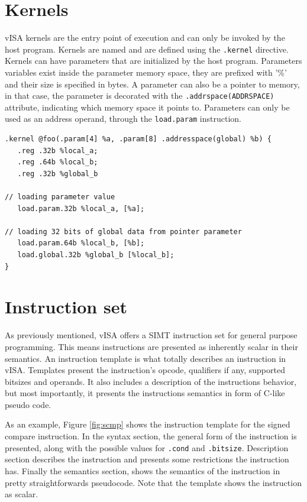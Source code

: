 \section{Kernels}
vISA kernels are the entry point of execution and can only be invoked by the
host program. Kernels are named and are defined using the \lstinline{.kernel}
directive. Kernels can have parameters that are initialized by the host
program. Parameters variables exist inside the parameter memory space, they are
prefixed with '\%' and their size is specified in bytes. A parameter can also
be a pointer to memory, in that case, the parameter is decorated with the
\lstinline{.addrspace(ADDRSPACE)} attribute, indicating which memory space it
points to. Parameters can only be used as an address operand, through the
\lstinline{load.param} instruction.

\begin{lstlisting}
.kernel @foo(.param[4] %a, .param[8] .addresspace(global) %b) {
   .reg .32b %local_a;
   .reg .64b %local_b;
   .reg .32b %global_b

// loading parameter value
   load.param.32b %local_a, [%a];
   
// loading 32 bits of global data from pointer parameter
   load.param.64b %local_b, [%b];
   load.global.32b %global_b [%local_b];
}
\end{lstlisting}

\section{Instruction set}
As previously mentioned, vISA offers a SIMT instruction set for general purpose
programming. This means instructions are presented as inherently scalar in
their semantics. An instruction template is what totally describes an
instruction in vISA. Templates present the instruction's opcode, qualifiers if
any, supported bitsizes and operands. It also includes a description of the
instructions behavior, but most importantly, it presents the instructions
semantics in form of C-like pseudo code.

As an example, Figure \ref{fig:scmp} shows the instruction template for the
signed compare instruction. In the syntax section, the general form of the
instruction is presented, along with the possible values for \lstinline{.cond}
and \lstinline{.bitsize}. Description section describes the instruction and
presents some restrictions the instruction has. Finally the semantics section,
shows the semantics of the instruction in pretty straightforwards pseudocode.
Note that the template shows the instruction as scalar.

